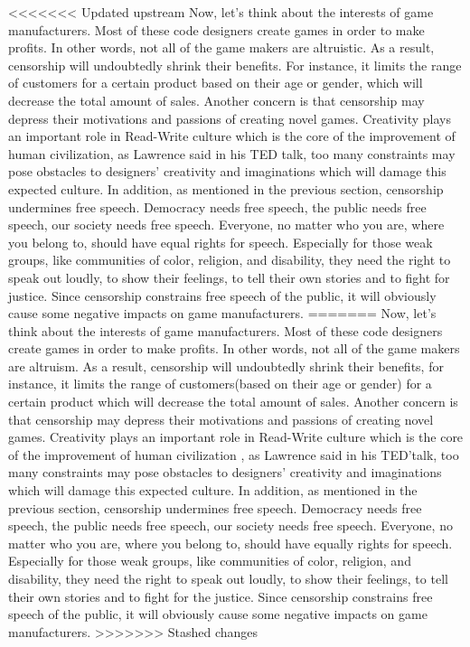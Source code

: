 <<<<<<< Updated upstream
Now,  let's think about the interests of game manufacturers. Most of these code designers create games in order to make profits. In other words, not all of the game makers are altruistic. As a result, censorship will undoubtedly shrink their benefits. For instance, it limits the range of customers for a certain product based on their age or gender, which will decrease the total amount of sales. Another concern is that censorship may depress their motivations and passions of creating novel games. Creativity plays an important role in Read-Write culture which is the core of the improvement of human civilization, as Lawrence said in his TED talk, too many constraints may pose obstacles to designers' creativity and imaginations which will damage this expected culture. In addition, as mentioned in the previous section, censorship undermines free speech. Democracy needs free speech, the public needs free speech, our society needs free speech. Everyone, no matter who you are, where you belong to, should have equal rights for speech. Especially for those weak groups, like communities of color, religion, and disability, they need the right to speak out loudly, to show their feelings, to tell their own stories and to fight for justice. Since censorship constrains free speech of the public, it will obviously cause some negative impacts on game manufacturers.
=======
Now, let's think about the interests of game manufacturers. Most of these code designers create games in order to make profits. In other words,  not all of the game makers are altruism. As a result, censorship will undoubtedly shrink their benefits, for instance, it limits the range of customers(based on their age or gender) for a certain product which will decrease the total amount of sales. Another concern is that censorship may depress their motivations and passions of creating novel games. Creativity plays an important role in Read-Write culture which is the core of the improvement of human civilization , as Lawrence said in his TED'talk, too many constraints may pose obstacles to designers' creativity and imaginations which will damage this expected culture. In addition, as mentioned in the previous section, censorship undermines free speech. Democracy needs free speech, the public needs free speech, our society needs free speech. Everyone, no matter who you are, where you belong to, should have equally rights for speech. Especially for those weak groups, like communities of color, religion, and disability, they need the right to speak out loudly, to show their feelings, to tell their own stories and to fight for the justice. Since censorship constrains free speech of the public, it will obviously cause some negative impacts on game manufacturers.
>>>>>>> Stashed changes

